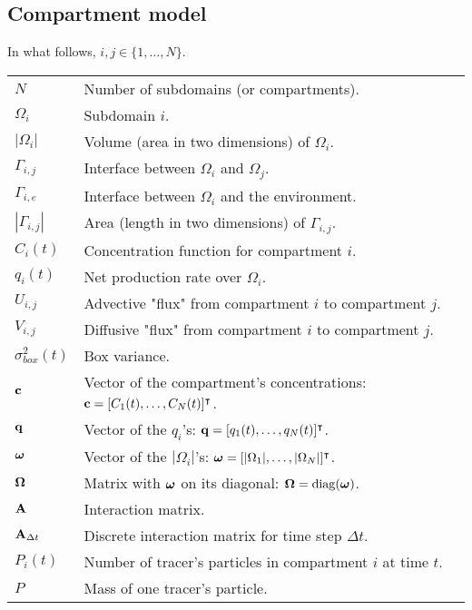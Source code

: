 \subsection*{Compartment model}
In what follows, $i,j \in \{1,\dots,N\}$.
\begin{table}[H]
\begin{tabular}{ll}
	$N$ & Number of subdomains (or compartments).\\
	$\Omega_i$ & Subdomain $i$.\\
	$|\Omega_i|$ & Volume (area in two dimensions) of $\Omega_i$.\\
	$\Gamma_{i,j}$ & Interface between $\Omega_i$ and $\Omega_j$.\\
	$\Gamma_{i,e}$ & Interface between $\Omega_i$ and the environment.\\
	$|\Gamma_{i,j}|$ & Area (length in two dimensions) of $\Gamma_{i,j}$.\\
	$C_i(t)$ & Concentration function for compartment $i$.\\
	$q_i(t)$ & Net production rate over $\Omega_i$.\\
	$U_{i,j}$ & Advective "flux" from compartment $i$ to compartment $j$.\\
	$V_{i,j}$ & Diffusive "flux" from compartment $i$ to compartment $j$.\\
	$\sigma_{box}^2(t)$ & Box variance.\\
	$\mathbf c$ & Vector of the compartment's concentrations: $\mathbf c = [C_1(t),\dots,C_N(t)]^\intercal$.\\
	$\mathbf q$ & Vector of the $q_i$'s: $\mathbf q = [q_1(t),\dots,q_N(t)]^\intercal$.\\
	$\boldsymbol \omega$ & Vector of the $|\Omega_i|$'s: $\boldsymbol \omega = [|\Omega_1|,\dots,|\Omega_N|]^\intercal$.\\
	$\boldsymbol \Omega$ & Matrix with $\boldsymbol \omega$ on its diagonal: $\boldsymbol \Omega = \operatorname{diag} (\boldsymbol \omega)$.\\
	$\mathbf A$ & Interaction matrix.\\
	$\mathbf A_{\Delta t}$ & Discrete interaction matrix for time step $\Delta t$.\\
	$P_i(t)$ & Number of tracer's particles in compartment $i$ at time $t$.\\
	$P$ & Mass of one tracer's particle.\\
\end{tabular}
\end{table}

